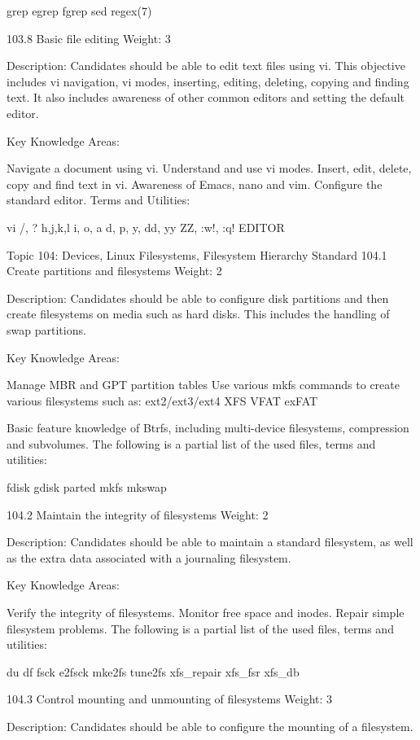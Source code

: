 grep
egrep
fgrep
sed
regex(7)
 

103.8 Basic file editing
Weight: 3

Description: Candidates should be able to edit text files using vi. This objective includes vi navigation, vi modes, inserting, editing, deleting, copying and finding text. It also includes awareness of other common editors and setting the default editor.

Key Knowledge Areas:

Navigate a document using vi.
Understand and use vi modes.
Insert, edit, delete, copy and find text in vi.
Awareness of Emacs, nano and vim.
Configure the standard editor.
Terms and Utilities:

vi
/, ?
h,j,k,l
i, o, a
d, p, y, dd, yy
ZZ, :w!, :q!
EDITOR
 
Topic 104: Devices, Linux Filesystems, Filesystem Hierarchy Standard
104.1 Create partitions and filesystems
Weight: 2

Description: Candidates should be able to configure disk partitions and then create filesystems on media such as hard disks. This includes the handling of swap partitions.

Key Knowledge Areas:

Manage MBR and GPT partition tables
Use various mkfs commands to create various filesystems such as:
ext2/ext3/ext4
XFS
VFAT
exFAT

Basic feature knowledge of Btrfs, including multi-device filesystems, compression and subvolumes.
The following is a partial list of the used files, terms and utilities:

fdisk
gdisk
parted
mkfs
mkswap
 

104.2 Maintain the integrity of filesystems
Weight: 2

Description: Candidates should be able to maintain a standard filesystem, as well as the extra data associated with a journaling filesystem.

Key Knowledge Areas:

Verify the integrity of filesystems.
Monitor free space and inodes.
Repair simple filesystem problems.
The following is a partial list of the used files, terms and utilities:

du
df
fsck
e2fsck
mke2fs
tune2fs
xfs_repair
xfs_fsr
xfs_db
 

104.3 Control mounting and unmounting of filesystems
Weight: 3

Description: Candidates should be able to configure the mounting of a filesystem.

